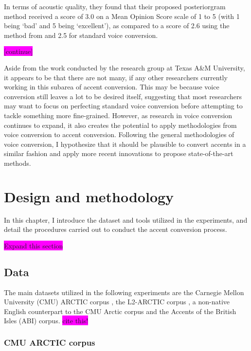 \documentclass
[
    a4paper,
    twoside,
    12pt,
]
{report}
\begin{document}
In terms of acoustic quality, they found that their proposed
posteriorgram method received a score of 3.0 on a Mean Opinion Score
scale of 1 to 5 (with 1 being `bad' and 5 being `excellent'), as
compared to a score of 2.6 using the method from \textcite{aryal2014}
and 2.5 for standard voice conversion.

\colorbox{magenta}{[continue]}

Aside from the work conducted by the research group at Texas A\&M
University, it appears to be that there are not many, if any other
researchers currently working in this subarea of accent conversion. This
may be because voice conversion still leaves a lot to be desired itself,
suggesting that most researchers may want to focus on perfecting
standard voice conversion before attempting to tackle something more
fine-grained. However, as research in voice conversion continues to
expand, it also creates the potential to apply methodologies from voice
conversion to accent conversion. Following the general methodologies of
voice conversion, I hypothesize that it should be plausible to convert
accents in a similar fashion and apply more recent innovations to
propose state-of-the-art methods.
\cleardoublepage
\chapter{Design and methodology}

In this chapter, I introduce the dataset and tools utilized in the
experiments, and detail the procedures carried out to conduct the accent
conversion process.

\colorbox{magenta}{Expand this section}

\hypertarget{data}{%
\section{Data}\label{data}}

The main datasets utilized in the following experiments are the Carnegie
Mellon University (CMU) ARCTIC corpus \parencite{kominek2004}, the
L2-ARCTIC corpus \parencite{zhao2018}, a non-native English counterpart
to the CMU Arctic corpus and the Accents of the British Isles (ABI)
corpus. \colorbox{magenta}{cite this!}

\hypertarget{cmu-arctic-corpus}{%
\subsection{CMU ARCTIC corpus}\label{cmu-arctic-corpus}}
\end{document}
